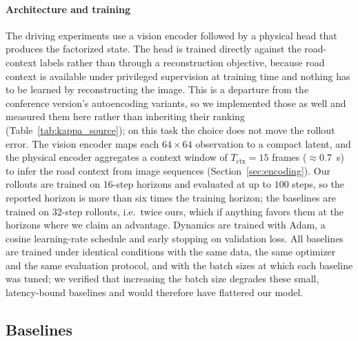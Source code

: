 \documentclass[preprint,12pt]{elsarticle}
\begin{document}
\paragraph{Architecture and training}
The driving experiments use a vision encoder followed by a physical head that
produces the factorized state. The head is trained directly against the road-context
labels rather than through a reconstruction objective, because road context is
available under privileged supervision at training time and nothing has to be
learned by reconstructing the image. This is a departure from the conference
version's autoencoding variants, so we implemented those as well and measured them
here rather than inheriting their ranking (Table~\ref{tab:kappa_source}); on this
task the choice does not move the rollout error.
The vision encoder maps each $64 \times 64$ observation to a compact latent, and
the physical encoder aggregates a context window of $T_{\mathrm{ctx}} = 15$ frames
($\approx$\SI{0.7}{s}) to infer the road context from image sequences
(Section~\ref{sec:encoding}).
Our rollouts are trained on $16$-step horizons and evaluated at up to $100$ steps,
so the reported horizon is more than six times the training horizon; the baselines
are trained on $32$-step rollouts, i.e.\ twice ours, which if anything favors
them at the horizons where we claim an advantage.
Dynamics are trained with Adam, a cosine learning-rate schedule and early stopping
on validation loss.
All baselines are trained under identical conditions with the same data, the same
optimizer and the same evaluation protocol, and with the batch sizes at which each
baseline was tuned; we verified that increasing the batch size degrades these
small, latency-bound baselines and would therefore have flattered our model.

\subsection{Baselines}\label{sec:baselines}
\end{document}
